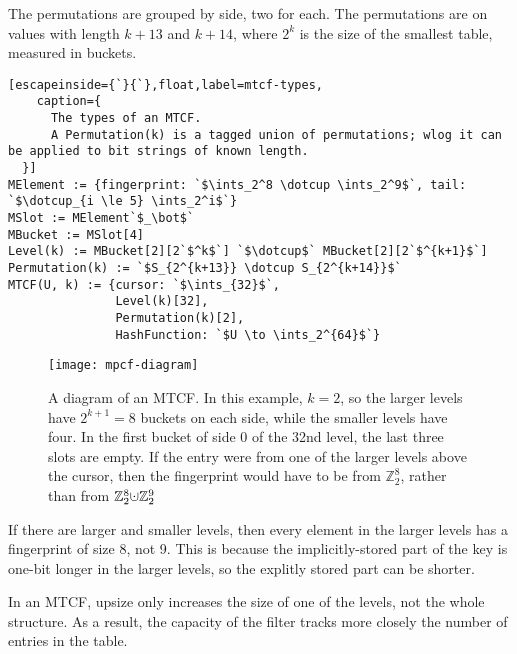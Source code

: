 \documentclass[sigconf, nonacm]{acmart}
\newcommand{\ints}{\mathbb{Z}}
\newcommand{\dotcup}{\ensuremath{\mathaccent\cdot\cup}}
\begin{document}
The permutations are grouped by side, two for each.
The permutations are on values with length $k + 13$ and $k + 14$, where $2^k$ is the size of the smallest table, measured in buckets.

\begin{lstlisting}[escapeinside={`}{`},float,label=mtcf-types,
    caption={
      The types of an MTCF.
      A Permutation(k) is a tagged union of permutations; wlog it can be applied to bit strings of known length.
  }]
MElement := {fingerprint: `$\ints_2^8 \dotcup \ints_2^9$`, tail: `$\dotcup_{i \le 5} \ints_2^i$`}
MSlot := MElement`$_\bot$`
MBucket := MSlot[4]
Level(k) := MBucket[2][2`$^k$`] `$\dotcup$` MBucket[2][2`$^{k+1}$`]
Permutation(k) := `$S_{2^{k+13}} \dotcup S_{2^{k+14}}$`
MTCF(U, k) := {cursor: `$\ints_{32}$`,
               Level(k)[32],
               Permutation(k)[2],
               HashFunction: `$U \to \ints_2^{64}$`}

\end{lstlisting}

\begin{figure}
  \texttt{[image: mpcf-diagram]}
\caption{\label{mtcf-diagram}
A diagram of an MTCF.
In this example, $k = 2$, so the larger levels have $2^{k+1} = 8$ buckets on each side, while the smaller levels have four.
In the first bucket of side 0 of the 32nd level, the last three slots are empty.
If the entry were from one of the larger levels above the cursor, then the fingerprint would have to be from $\ints_2^8$, rather than from $\ints_2^8 \dotcup \ints_2^9$
}

\end{figure}

If there are larger and smaller levels, then every element in the larger levels has a fingerprint of size 8, not 9.
This is because the implicitly-stored part of the key is one-bit longer in the larger levels, so the explitly stored part can be shorter.

In an MTCF, upsize only increases the size of one of the levels, not the whole structure.
As a result, the capacity of the filter tracks more closely the number of entries in the table.
\end{document}
